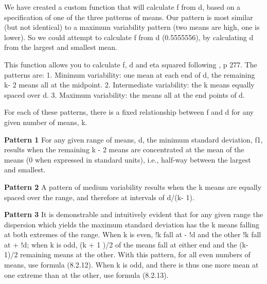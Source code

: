 \documentclass[
]{book}
\begin{document}
We have created a custom function that will calculate f from d, based on a specification of one of the three patterns of means. Our pattern is most similar (but not identical) to a maximum variability pattern (two means are high, one is lower). So we could attempt to calculate f from d (0.5555556), by calculating d from the largest and smallest mean.

This function allows you to calculate f, d and eta squared
following \citet{cohen1988spa}, p 277. The patterns are:
1. Minimum variability: one mean at each end of d, the remaining k- 2 means all at the midpoint.
2. Intermediate variability: the k means equally spaced over d.
3. Maximum variability: the means all at the end points of d.

For each of these patterns, there is a fixed relationship between f and d for any given number of means, k.

\textbf{Pattern 1}
For any given range of means, d, the minimum standard deviation, f1, results when the remaining k - 2 means are concentrated at the mean of the means (0 when expressed in standard units), i.e., half-way between the largest and smallest.

\textbf{Pattern 2}
A pattern of medium variability results when the k means are equally spaced over the range, and therefore at intervals of d/(k- 1).

\textbf{Pattern 3}
It is demonstrable and intuitively evident that for any given range the dispersion which yields the maximum standard deviation has the k means falling at both extremes of the range. When k is even, !k fall at - !d and the other !k fall at + !d; when k is odd, (k + 1 )/2 of the means fall at either end and the (k- 1)/2 remaining means at the other. With this pattern, for all even numbers of means, use formula (8.2.12). When k is odd, and there is thus one more mean at one extreme than at the other, use formula (8.2.13).
\end{document}
